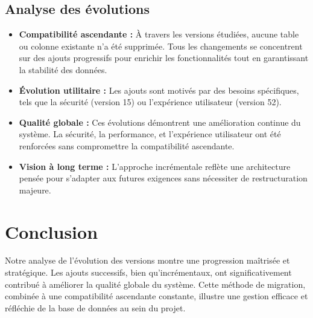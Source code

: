 \documentclass[a4paper,11pt]{article}
\begin{document}
\subsection*{Analyse des évolutions}

\begin{itemize}
    \item \textbf{Compatibilité ascendante :} À travers les versions étudiées, aucune table ou colonne existante n'a été supprimée. Tous les changements se concentrent sur des ajouts progressifs pour enrichir les fonctionnalités tout en garantissant la stabilité des données.

    \item \textbf{Évolution utilitaire :} Les ajouts sont motivés par des besoins spécifiques, tels que la sécurité (version 15) ou l'expérience utilisateur (version 52).

    \item \textbf{Qualité globale :} Ces évolutions démontrent une amélioration continue du système. La sécurité, la performance, et l'expérience utilisateur ont été renforcées sans compromettre la compatibilité ascendante.

    \item \textbf{Vision à long terme :} L'approche incrémentale reflète une architecture pensée pour s'adapter aux futures exigences sans nécessiter de restructuration majeure.
\end{itemize}

\section*{Conclusion}

Notre analyse de l'évolution des versions montre une progression maîtrisée et stratégique. Les ajouts successifs, bien qu'incrémentaux, ont significativement contribué à améliorer la qualité globale du système. Cette méthode de migration, combinée à une compatibilité ascendante constante, illustre une gestion efficace et réfléchie de la base de données au sein du projet.
\end{document}
